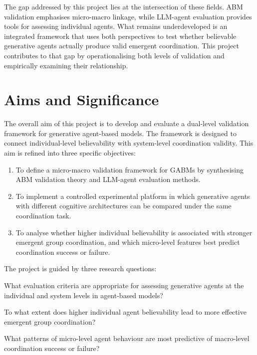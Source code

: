 \documentclass[11pt]{article}
\begin{document}
The gap addressed by this project lies at the intersection of these fields. ABM validation emphasises micro-macro linkage, while LLM-agent evaluation provides tools for assessing individual agents. What remains underdeveloped is an integrated framework that uses both perspectives to test whether believable generative agents actually produce valid emergent coordination. This project contributes to that gap by operationalising both levels of validation and empirically examining their relationship.

\section{Aims and Significance}

The overall aim of this project is to develop and evaluate a dual-level validation framework for generative agent-based models. The framework is designed to connect individual-level believability with system-level coordination validity. This aim is refined into three specific objectives:

\begin{enumerate}
    \item To define a micro-macro validation framework for GABMs by synthesising ABM validation theory and LLM-agent evaluation methods.
    \item To implement a controlled experimental platform in which generative agents with different cognitive architectures can be compared under the same coordination task.
    \item To analyse whether higher individual believability is associated with stronger emergent group coordination, and which micro-level features best predict coordination success or failure.
\end{enumerate}

The project is guided by three research questions:

\begin{description}[leftmargin=1.4cm, style=nextline]
    \item[RQ1] What evaluation criteria are appropriate for assessing generative agents at the individual and system levels in agent-based models?
    \item[RQ2] To what extent does higher individual agent believability lead to more effective emergent group coordination?
    \item[RQ3] What patterns of micro-level agent behaviour are most predictive of macro-level coordination success or failure?
\end{description}
\end{document}

